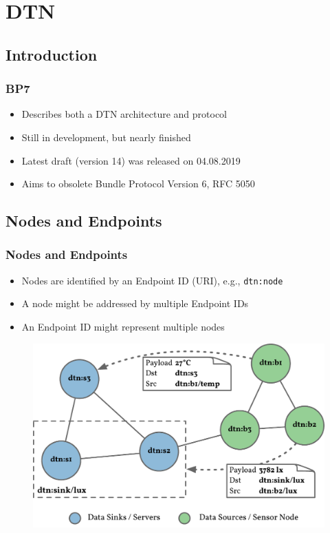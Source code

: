 \section{\acf{DTN}}

\subsection{Introduction}

\begin{frame}
  \frametitle{\acf{BP7}}

  \begin{itemize}
  \item Describes both a \acs{DTN} architecture and protocol
  \item Still in development, but nearly finished
  \item Latest draft (version 14) was released on 04.08.2019
  \item Aims to obsolete Bundle Protocol Version 6, RFC 5050
  \end{itemize}
\end{frame}

\subsection{Nodes and Endpoints}

\begin{frame}
  \frametitle{Nodes and Endpoints}

  \begin{itemize}
  \item Nodes are identified by an Endpoint ID (URI), e.g., \texttt{dtn:node}
  \item A node might be addressed by multiple Endpoint IDs
  \item An Endpoint ID might represent multiple nodes
  \end{itemize}

  \begin{figure}
    \includegraphics[width=0.75\linewidth,keepaspectratio]{include/nodes-endpoints}
  \end{figure}
\end{frame}

